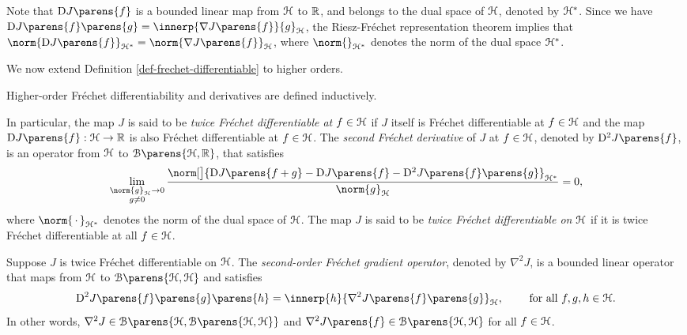 \begin{remark}
	Note that $\Diff J \parens{f}$ is a bounded linear map from $\mathcal{H}$ to $\mathbb{R}$, and belongs to the dual space of $\mathcal{H}$, denoted by $\mathcal{H}^*$. Since we have $\Diff J \parens{f} \parens{g} = \innerp{\nabla J \parens{f}}{g}_{\calH}$, the Riesz-Fr{\'e}chet representation theorem implies that $\norm{\Diff J \parens{f}}_{\calH^*} = \norm{\nabla J \parens{f}}_{\calH}$, where $\norm{}_{\calH^*}$ denotes the norm of the dual space $\mathcal{H}^*$. 
\end{remark}

We now extend Definition \ref{def-frechet-differentiable} to higher orders. 

\begin{definition}\label{def-frechet-derivative-higher-order}
	Higher-order Fr{\'e}chet differentiability and derivatives are defined inductively. 
	
	In particular, the map $J$ is said to be \textit{twice Fr{\'e}chet differentiable at $f \in \mathcal{H}$} if $J$ itself is Fr{\'e}chet differentiable at $f \in \mathcal{H}$ and the map $\Diff J \parens{f}: \calH \to \Real$ is also Fr{\'e}chet differentiable at $f \in \mathcal{H}$. The \textit{second Fr{\'e}chet derivative} of $J$ at $f \in \mathcal{H}$, denoted by $\Diff^2 J \parens{f}$, is an operator from $\mathcal{H}$ to $\calB \parens{\calH, \Real}$, that satisfies 
	\begin{align}\label{eq-2ndfrederivative}
		\lim_{\substack{\norm{g}_{\calH} \to 0 \\ g \neq 0}} \frac{\norm[\big]{\Diff J \parens{f + g} - \Diff J \parens{f} - \Diff^2 J \parens{f} \parens{g} }_{\calH^*}}{\norm{g}_{\calH}} = 0, 
	\end{align}
	where $\norm{\,\cdot\,}_{\calH^*}$ denotes the norm of the dual space of $\mathcal{H}$. The map $J$ is said to be \textit{twice Fr{\'e}chet differentiable on $\mathcal{H}$} if it is twice Fr{\'e}chet differentiable at all $f \in \mathcal{H}$. 
	
	Suppose $J$ is twice Fr{\'e}chet differentiable on $\mathcal{H}$. The \textit{second-order Fr{\'e}chet gradient operator}, denoted by $\nabla^2 J$, is a bounded linear operator that maps from $\mathcal{H}$ to $\calB \parens{\calH, \calH}$ and satisfies 
	\begin{align*}
		\Diff^2 J \parens{f} \parens{g} \parens{h} = \innerp{h}{ \nabla^2 J \parens{f} \parens{g}}_{\calH}, \qquad \text{ for all } f, g, h \in \calH. 
	\end{align*}
	In other words, $\nabla^2 J \in \calB \parens{\calH, \calB \parens{\calH, \calH}}$ and $\nabla^2 J \parens{f} \in \calB \parens{\calH, \calH}$ for all $f \in \mathcal{H}$. 
\end{definition}

